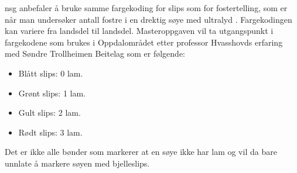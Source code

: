 \noindent
\acrshort{nsg} anbefaler å bruke samme fargekoding for slips som for fostertelling, som er når man undersøker antall fostre i en drektig søye med ultralyd \cite{FostertellingOgSniktitt2015}. Fargekodingen kan variere fra landsdel til landsdel. Masteroppgaven vil ta utgangspunkt i fargekodene som brukes i Oppdalområdet etter professor Hvasshovds erfaring med Søndre Trollheimen Beitelag som er følgende: 
\begin{itemize}
    \item Blått slips: 0 lam. 
    \item Grønt slips: 1 lam.
    \item Gult slips: 2 lam.
    \item Rødt slips: 3 lam. 
\end{itemize}
Det er ikke alle bønder som markerer at en søye ikke har lam og vil da bare unnlate å markere søyen med bjelleslips.

